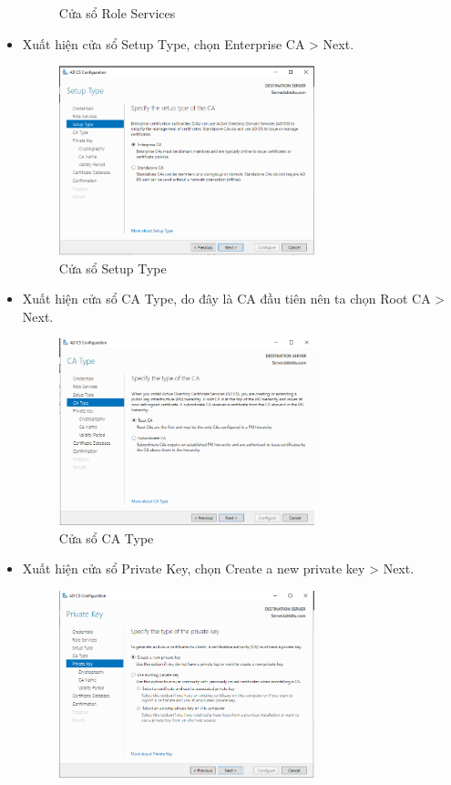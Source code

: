 \documentclass[13pt]{report}
\begin{document}
\begin{itemize}
\begin{figure}[htp]
			\caption{Cửa sổ Role Services}
		\end{figure}
		\item Xuất hiện cửa sổ Setup Type, chọn Enterprise CA > Next.
		\begin{figure}[htp]
			\centering
			\includegraphics[width=0.7\textwidth]{image/Gui/ADCS/16.png}
			\caption{Cửa sổ Setup Type}
		\end{figure}
		\newpage
		\item Xuất hiện cửa sổ CA Type, do đây là CA đầu tiên nên ta chọn Root CA > Next.
		\begin{figure}[htp]
			\centering
			\includegraphics[width=0.7\textwidth]{image/Gui/ADCS/17.png}
			\caption{Cửa sổ CA Type}
		\end{figure}
		\item Xuất hiện cửa sổ Private Key, chọn Create a new private key > Next.
		\begin{figure}[htp]
			\centering
			\includegraphics[width=0.7\textwidth]{image/Gui/ADCS/18.png}

\end{figure}
\end{itemize}
\end{document}
